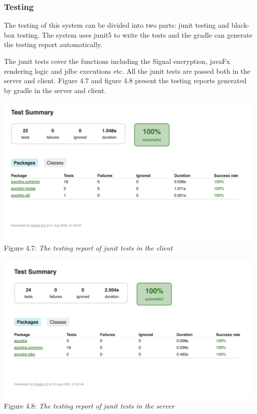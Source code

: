 \subsubsection{Testing}
The testing of this system can be divided into two parts: junit testing and black-box testing. The system uses junit5 to write the tests and the gradle can generate the testing report automatically.

The junit tests cover the functions including the Signal encryption, javaFx rendering logic and jdbc executions etc. All the junit tests are passed both in the server and client. Figure 4.7 and figure 4.8 present the testing reports generated by gradle in the server and client.

\begin{center}
\includegraphics[scale=.45]{../4-Implementation/resources/client-report.png}\\
Figure 4.7: \textit{The testing report of junit tests in the client}
\end{center}

\begin{center}
\includegraphics[scale=.45]{../4-Implementation/resources/server-report.png}\\
Figure 4.8: \textit{The testing report of junit tests in the server}
\end{center}

